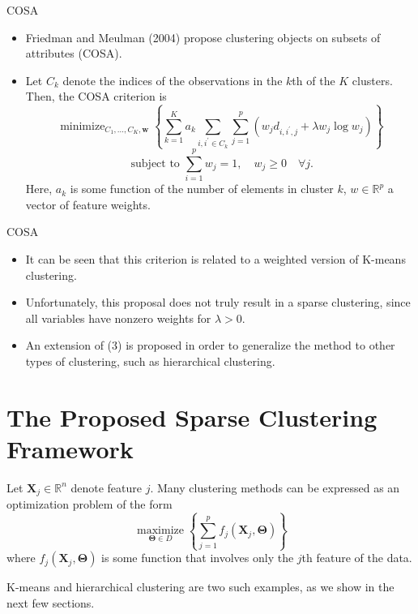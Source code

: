 \documentclass[12pt]{beamer}
\begin{document}
\begin{frame}{COSA}
\begin{itemize}
\item Friedman and Meulman (2004) propose clustering objects on
subsets of attributes (COSA).
\item Let $C_k$ denote the indices of the
observations in the $k$th of the $K$ clusters. Then, the COSA criterion is
$$
\operatorname{minimize}_{C_{1}, \ldots, C_{K}, \mathbf{w}}\left\{\sum_{k=1}^{K} a_{k} \sum_{i, i^{\prime} \in C_{k}} \sum_{j=1}^{p}\left(w_{j} d_{i, i^{\prime}, j}+\lambda w_{j} \log w_{j}\right)\right\}
$$
$$
\text { subject to } \sum_{i=1}^{p} w_{j}=1, \quad w_{j} \geq 0 \quad \forall j.
$$
Here, $a_k$ is some function of the number of elements in cluster $k$, $w\in \mathbb{R}^p$ a vector of feature weights.
\end{itemize}
\end{frame}

\begin{frame}{COSA}
\begin{itemize}
\item  It can be seen that this criterion is related to
a weighted version of K-means clustering.
\item Unfortunately, this
proposal does not truly result in a sparse clustering, since all
variables have nonzero weights for $\lambda>0$.
\item An extension of (3)
is proposed in order to generalize the method to other types of
clustering, such as hierarchical clustering.
\end{itemize}
\end{frame}

\section{The Proposed Sparse Clustering Framework}
\begin{frame}
Let $\mathbf{X}_{j}\in \mathbb{R}^n$ denote feature $j$. Many clustering methods can be expressed as an optimization problem of the form 
$$
\underset{\mathbf{\Theta} \in D}{\operatorname{maximize}}\left\{\sum_{j=1}^{p} f_{j}\left(\mathbf{X}_{j}, \mathbf{\Theta}\right)\right\}
$$
where $f_j(\mathbf{X}_{j},\mathbf{\Theta})$ is some function that involves only the $j$th feature of the data.

K-means and hierarchical clustering are two such examples, as
we show in the next few sections. 
\end{frame}
\end{document}
